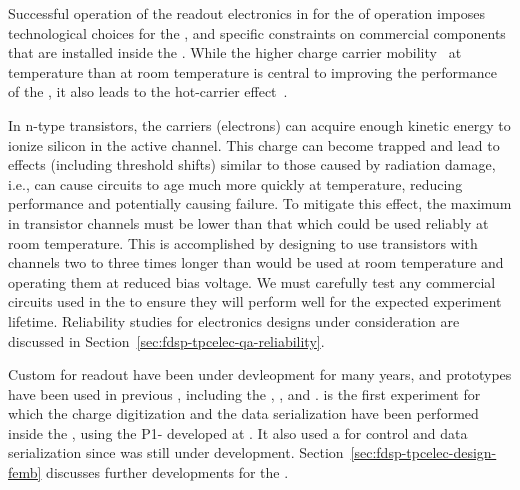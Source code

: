 Successful operation of the readout electronics in  for the 
\dunelifetime %
of  operation %
imposes technological choices %
for the  ,  %
and specific constraints on commercial components that are installed
inside the . While the higher charge carrier 
mobility~\cite{Hairapetian1989} at  temperature than at room
temperature is central to improving the performance of the  , it also leads
to the hot-carrier effect~\cite{Hot-electron}. 

In n-type  transistors, the carriers (electrons)
can acquire enough kinetic energy to ionize silicon in the active channel. This
charge can become trapped and lead to effects (including threshold shifts)
similar to those caused by radiation damage, i.e., %
can cause 
circuits to age much more quickly at  temperature, %
reducing performance and potentially causing failure. To mitigate this effect,
the maximum \efield in transistor channels must be lower than %
that which could %
be used reliably at room temperature. 
%
This is accomplished by designing  to use transistors 
with  channels two to three times longer than would be used at room temperature
and operating them at reduced bias voltage. 
%
We must carefully test any commercial circuits used in the  %
to ensure 
they will perform well for the expected experiment lifetime. %
Reliability studies for  electronics designs under %
consideration are 
discussed in Section~\ref{sec:fdsp-tpcelec-qa-reliability}.

Custom  for  readout have been under devleopment for many years, and
 prototypes have been used in previous , 
including the , , and .  is the first
experiment for which the charge digitization %
and the data serialization
have been performed inside the , using the P1-  
developed at . %
It also used a  for control and data serialization since  was
still under development. %
Section~\ref{sec:fdsp-tpcelec-design-femb} discusses further  developments for the .

